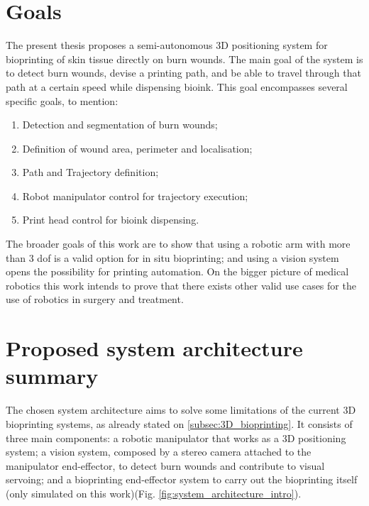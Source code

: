\section{Goals} %
\label{sec:goals}

The present thesis proposes a semi-autonomous 3D positioning system for bioprinting of skin tissue directly on burn wounds. The main goal of the system is to detect burn wounds, devise a printing path, and be able to travel through that path at a certain speed while dispensing bioink. This goal encompasses several specific goals, to mention:
\begin{enumerate}
    \item Detection and segmentation of burn wounds;
    \item Definition of wound area, perimeter and localisation;
    \item Path and Trajectory definition;
    \item Robot manipulator control for trajectory execution;
    \item Print head control for bioink dispensing.
\end{enumerate}
The broader goals of this work are to show that using a robotic arm with more than 3 \gls{dof} is a valid option for in situ bioprinting; and using a vision system opens the possibility for printing automation. On the bigger picture of medical robotics this work intends to prove that there exists other valid use cases for the use of robotics in surgery and treatment.


\section{Proposed system architecture summary} %
\label{sec:proposed_system_architecture_summary}

The chosen system architecture aims to solve some limitations of the current 3D bioprinting systems, as already stated on \ref{subsec:3D_bioprinting}. It consists of three main components: a robotic manipulator that works as a 3D positioning system; a vision system, composed by a stereo camera attached to the manipulator end-effector, to detect burn wounds and contribute to visual servoing; and a bioprinting end-effector system to carry out the bioprinting itself (only simulated on this work)(Fig. \ref{fig:system_architecture_intro}).

